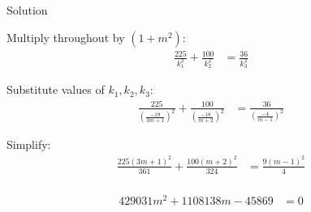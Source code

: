 \documentclass{beamer}
\numberwithin{equation}{section}
\providecommand{\brak}[1]{\ensuremath{\left(#1\right)}}
\theoremstyle{remark}
\newcommand{\myvec}[1]{\ensuremath{\begin{pmatrix}#1\end{pmatrix}}}
\let\vec\mathbf
\begin{document}
\begin{frame}{Solution}

Multiply throughout by $(1+m^2)$:
\begin{align}
\frac{225}{k_1^2} + \frac{100}{k_2^2} &= \frac{36}{k_3^2}
\end{align}

Substitute values of $k_1,k_2,k_3$:
\begin{align}
\frac{225}{\brak{\tfrac{-19}{3m+1}}^2} + \frac{100}{\brak{\tfrac{-18}{m+2}}^2}
&= \frac{36}{\brak{\tfrac{-4}{m-1}}^2}
\end{align}

Simplify:
\begin{align}
\frac{225(3m+1)^2}{361} + \frac{100(m+2)^2}{324} &= \frac{9(m-1)^2}{4}\\
 \end{align}

\begin{align}
  429031m^2 + 1108138m -45869 &= 0
\end{align}

\end{frame}

\end{document}
